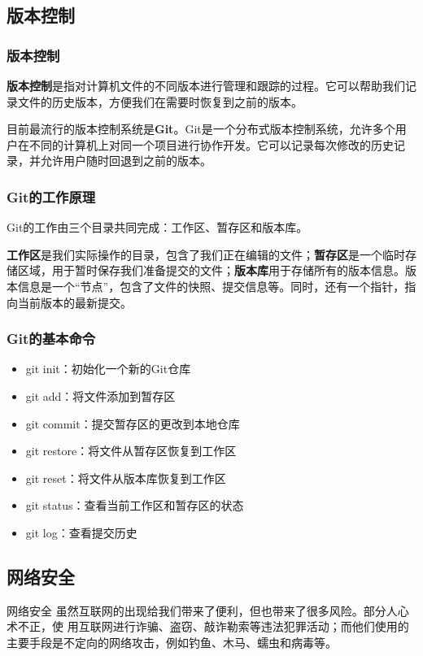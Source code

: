 \documentclass{beamer}
\begin{document}
\subsection{版本控制}
\begin{frame}
    \frametitle{版本控制}
    \textbf{版本控制}是指对计算机文件的不同版本进行管理和跟踪的过程。它可以帮助我们记录文件的历史版本，方便我们在需要时恢复到之前的版本。

    目前最流行的版本控制系统是\textbf{Git}。Git是一个分布式版本控制系统，允许多个用户在不同的计算机上对同一个项目进行协作开发。它可以记录每次修改的历史记录，并允许用户随时回退到之前的版本。
\end{frame}

\begin{frame}
    \frametitle{Git的工作原理}
    Git的工作由三个目录共同完成：工作区、暂存区和版本库。

    \textbf{工作区}是我们实际操作的目录，包含了我们正在编辑的文件；\textbf{暂存区}是一个临时存储区域，用于暂时保存我们准备提交的文件；\textbf{版本库}用于存储所有的版本信息。版本信息是一个“节点”，包含了文件的快照、提交信息等。同时，还有一个指针，指向当前版本的最新提交。
\end{frame}

\begin{frame}
    \frametitle{Git的基本命令}
    \begin{itemize}
        \item git init：初始化一个新的Git仓库
        \item git add：将文件添加到暂存区
        \item git commit：提交暂存区的更改到本地仓库
        \item git restore：将文件从暂存区恢复到工作区
        \item git reset：将文件从版本库恢复到工作区
        \item git status：查看当前工作区和暂存区的状态
        \item git log：查看提交历史
    \end{itemize}
\end{frame}
\subsection{网络安全}

\begin{frame}{网络安全}
    虽然互联网的出现给我们带来了便利，但也带来了很多风险。部分人心术不正，使
    用互联网进行诈骗、盗窃、敲诈勒索等违法犯罪活动；而他们使用的主要手段是不定向的网络攻击，例如钓鱼、木马、蠕虫和病毒等。
\end{frame}
\end{document}
